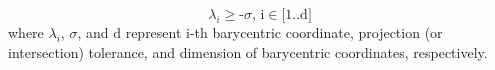 \begin{equation} \label{eq:projtol}
	\lambda _i\text{$\geq $-$\sigma $, i$\in $[1..d]}
\end{equation}
where $\lambda _i$, $\sigma$, and $\text{d}$ represent i-th barycentric coordinate, projection (or intersection) tolerance, and dimension of barycentric coordinates, respectively.
